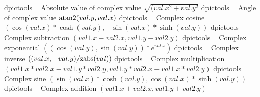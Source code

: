 %
  {dpictools}%
  {$\;\;$ Absolute value of complex value $\sqrt{(val.x^2+val.y^2}$}%
%
  {dpictools}%
  {$\;\;$ Angle of complex value $\hbox{atan2}(val.y, val.x)$}%
%
  {dpictools}%
  {$\;\;$ Complex cosine
    $(\cos(val.x)*\cosh(val.y), -\sin(val.x)*\sinh(val.y))$}%
%
  {dpictools}%
  {$\;\;$ Complex subtraction $(val1.x-val2.x, val1.y-val2.y)$}%
%
  {dpictools}%
  {$\;\;$ Complex exponential $((\cos(val.y), \sin(val.y))*e^{val.x})$}%
%
  {dpictools}%
  {$\;\;$ Complex inverse $((val.x, -val.y)/\hbox{zabs}(val))$}%
%
  {dpictools}%
  {$\;\;$ Complex multiplication
   $(val1.x*val2.x-val1.y*val2.y, val1.y*val2.x+val1.x*val2.y)$}%
%
  {dpictools}%
  {$\;\;$ Complex sine
   $(\sin(val.x)*\cosh(val.y), \cos(val.x)*\sinh(val.y))$}%
%
  {dpictools}%
  {$\;\;$ Complex addition $(val1.x+val2.x, val1.y+val2.y)$}%

